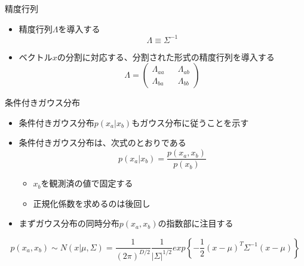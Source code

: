 \begin{frame}{精度行列}
 \begin{itemize}
  \item \alert{精度行列}$\Lambda$を導入する
        \begin{equation}
         \Lambda \equiv \Sigma^{-1}
        \end{equation}

  \item ベクトル$x$の分割に対応する、分割された形式の精度行列を導入する
        \begin{equation}
         \Lambda=
          \begin{pmatrix}
           \Lambda_{aa} && \Lambda_{ab}\\
           \Lambda_{ba} && \Lambda_{bb}
          \end{pmatrix}
        \end{equation}
 \end{itemize}
\end{frame}


\begin{frame}{条件付きガウス分布}
 \begin{itemize}
  \item 条件付きガウス分布$p(x_a|x_b)$もガウス分布に従うことを示す
  \item 条件付きガウス分布は、次式のとおりである
        \begin{equation}
         p(x_a | x_b) = \frac{p(x_a, x_b)}{p(x_b)}
        \end{equation}
        \begin{itemize}
         \item $x_b$を観測済の値で\alert{固定}する
         \item 正規化係数を求めるのは後回し
        \end{itemize}
  \item まずガウス分布の同時分布$p(x_a,x_b)$の指数部に注目する
 \end{itemize}
 \begin{equation}
  p(x_a,x_b) \sim N(x|\mu,\Sigma) = \frac{1}{(2\pi)^{D/2}}\frac{1}{|\Sigma|^{1/2}}exp\left\{-\frac{1}{2}(x - \mu)^{T}\Sigma^{-1}(x-\mu)\right\}
 \end{equation}
\end{frame}

